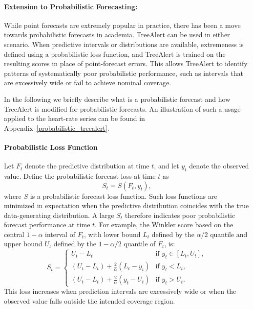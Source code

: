 \documentclass[]{interact}
\theoremstyle{definition}
\begin{document}
\paragraph*{Extension to Probabilistic Forecasting:}

While point forecasts are extremely popular in practice, there has been a move towards probabilistic forecasts in academia. TreeAlert can be used in either scenario. When predictive intervals or distributions are available, extremeness is defined using a probabilistic loss function, and TreeAlert is trained on the resulting scores in place of point-forecast errors. This allows TreeAlert to identify patterns of systematically poor probabilistic performance, such as intervals that are excessively wide or fail to achieve nominal coverage. 

In the following we briefly describe what is a probabilistic forecast and how TreeAlert is modified for probabilistic forecasts. An illustration of such a usage applied to the heart-rate series can be found in Appendix~\ref{probabilistic_treealert}.

\paragraph{Probabilistic Loss Function}
Let $F_t$ denote the predictive distribution at time $t$, and let $y_t$ denote the observed value.
Define the probabilistic forecast loss at time $t$ as
\begin{equation}
S_t = S(F_t, y_t),
\end{equation}
where $S$ is a probabilistic forecast loss function. Such loss functions are minimized in expectation when the predictive distribution coincides with the true data-generating distribution. A large $S_t$ therefore indicates poor probabilistic forecast performance at time $t$. For example, the Winkler score based on the central $1-\alpha$ interval of $F_t$, with lower bound $L_t$ defined by the $\alpha/2$ quantile and upper bound $U_t$ defined by the $1-\alpha/2$ quantile of $F_t$, is:
\begin{equation}
S_t =
\begin{cases}
U_t - L_t 
& \text{if } y_t \in [L_t, U_t], \\[3pt]
(U_t - L_t) + \frac{2}{\alpha}(L_t - y_t) 
& \text{if } y_t < L_t, \\[3pt]
(U_t - L_t) + \frac{2}{\alpha}(y_t - U_t) 
& \text{if } y_t > U_t.
\end{cases}
\end{equation}
This loss increases when prediction intervals are excessively wide or 
when the observed value falls outside the intended coverage region.
\end{document}
